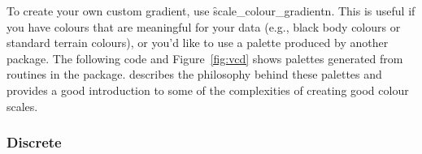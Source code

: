 % 



To create your own custom gradient, use \f{scale_colour_gradientn}. This is useful if you have colours that are meaningful for your data (e.g., black body colours or standard terrain colours), or you'd like to use a palette produced by another package. The following code and Figure~\ref{fig:vcd} shows palettes generated from routines in the  package. \citet{zeileis:2008} describes the philosophy behind these palettes and provides a good introduction to some of the complexities of creating good colour scales.   

% 


\subsubsection{Discrete}
\label{ssub:colour-discrete}

